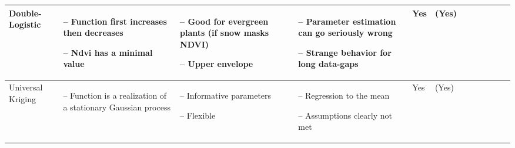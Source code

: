 \begin{table}[!ht]
\begin{tabular}{p{1.6cm}p{3.3cm}p{3.3cm}p{3.4cm}p{0.4cm}p{0.4cm}p{3cm}p{3cm}p{3cm}p{3cm}p{2.7cm}p{3cm}|}
		Double-Logistic                                                                                                                                              &
		\begin{cptitemize} \item[--]  Function first increases then decreases \item[--]  Ndvi has a minimal value                            \end{cptitemize}        &
		\begin{cptitemize} \item[--]  Good for evergreen plants (if snow masks NDVI) \item[--]  Upper envelope                                \end{cptitemize}        &
		\begin{cptitemize} \item[--]  Parameter estimation can go seriously wrong \item[--]  Strange behavior for long data-gaps             \end{cptitemize}        &
		Yes                                                                                                                                                          &
		(Yes)                                                                                                                                                         \\ \hline%

		Universal Kriging                                                                                                                                            &
		\begin{cptitemize} \item[--]  Function is a realization of a stationary Gaussian process                                      \end{cptitemize}               &
		\begin{cptitemize} \item[--]  Informative parameters \item[--]  Flexible                                                             \end{cptitemize}        &
		\begin{cptitemize} \item[--]  Regression to the mean \item[--]  Assumptions clearly not met                                          \end{cptitemize}        &
		Yes                                                                                                                                                          &
		(Yes)                                                                                                                                                         \\ %


\end{tabular}
\end{table}
